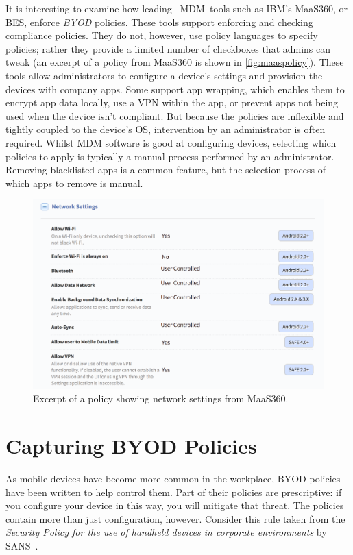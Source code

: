 \documentclass{llncs}
\begin{document}
It is interesting to examine how leading~\cite{rob_smith_magic_2016} MDM~tools such as IBM's MaaS360, or \ac{BES}, enforce \emph{BYOD} policies.
These tools support enforcing and checking compliance policies. 
They do not, however, use policy languages to specify policies; rather they provide a limited number of checkboxes that admins can tweak (an excerpt of a policy from MaaS360 is shown in \autoref{fig:maaspolicy}).
These tools allow administrators to configure a device's settings and provision the devices with company apps.
Some support app wrapping, which enables them to encrypt app data locally, use a VPN within the app, or prevent apps not being used when the device isn't compliant.
But because the policies are inflexible and tightly coupled to the device's OS, intervention by an administrator is often required.
Whilst MDM software is good at configuring devices, selecting which policies to apply is typically a manual process performed by an administrator.
Removing blacklisted apps is a common feature, but the selection process of which apps to remove is manual.

\begin{figure}
  \includegraphics[width=\linewidth]{figures/maas360-policy.png}
  \caption{Excerpt of a policy showing network settings from MaaS360.}
  \label{fig:maaspolicy}
\end{figure}

\section{Capturing BYOD Policies}
\label{sec:idea}

As mobile devices have become more common in the workplace, BYOD policies have been written to help control them.
Part of their policies are prescriptive:  if you configure your device in this way, you will mitigate that threat.
The policies contain more than just configuration, however.
Consider this rule taken from the \emph{Security Policy for the use of handheld devices in corporate environments} by SANS~\cite{nicholas_r._c._guerin_security_2008}.
\end{document}
